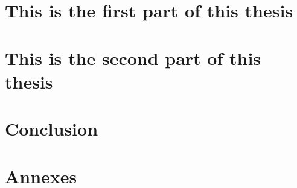 





    \frontmatter 

    

    \setcounter{secnumdepth}{3}
    \setcounter{tocdepth}{3}
    \tableofcontents

    

    \mainmatter

    

    \cleardoublepage
    \part{This is the first part of this thesis}
    
    

    \cleardoublepage
    \part{This is the second part of this thesis}
    
    

    \cleardoublepage
    \part{Conclusion}
    

    \appendix
    \cleardoublepage
    \part{Annexes}
    
    

    \cleardoublepage 
    \listoffigures

    \cleardoublepage 
    \listoftables

    \cleardoublepage 
    
    


